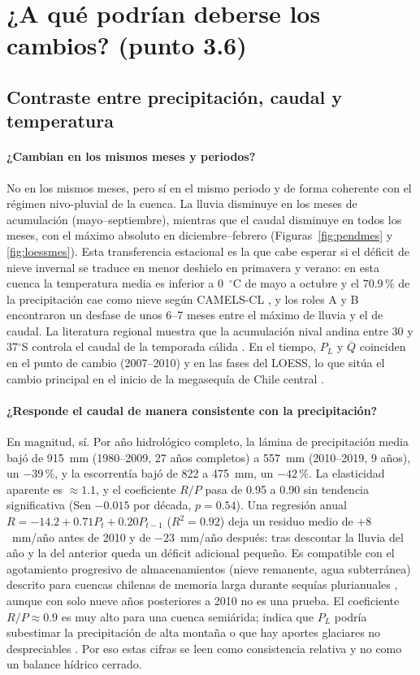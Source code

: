 \documentclass[11pt,letterpaper]{article}
\begin{document}
\section{¿A qué podrían deberse los cambios? (punto 3.6)}

\subsection{Contraste entre precipitación, caudal y temperatura}

\paragraph{¿Cambian en los mismos meses y periodos?} No en los mismos meses, pero sí en el mismo periodo y
de forma coherente con el régimen nivo-pluvial de la cuenca. La lluvia disminuye en los meses de acumulación
(mayo--septiembre), mientras que el caudal disminuye en todos los meses, con el máximo absoluto en
diciembre--febrero (Figuras~\ref{fig:pendmes} y \ref{fig:loessmes}). Esta transferencia estacional es la que
cabe esperar si el déficit de nieve invernal se traduce en menor deshielo en primavera y verano: en esta cuenca
la temperatura media es inferior a 0~$^\circ$C de mayo a octubre y el 70.9\,\% de la precipitación cae como nieve
según CAMELS-CL \citep{AlvarezGarreton2018}, y los roles A y B encontraron un desfase de unos 6--7 meses entre
el máximo de lluvia y el de caudal. La literatura regional muestra que la acumulación nival andina entre
30 y 37$^\circ$S controla el caudal de la temporada cálida \citep{Masiokas2006}. En el tiempo, $P_L$ y $\overline{Q}$
coinciden en el punto de cambio (2007--2010) y en las fases del LOESS, lo que sitúa el cambio principal en el
inicio de la megasequía de Chile central \citep{Garreaud2017,Garreaud2020}.

\paragraph{¿Responde el caudal de manera consistente con la precipitación?} En magnitud, sí. Por año
hidrológico completo, la lámina de precipitación media bajó de 915~mm (1980--2009, 27 años completos) a 557~mm
(2010--2019, 9 años), un $-39$\,\%, y la escorrentía bajó de 822 a 475~mm, un $-42$\,\%. La elasticidad aparente
es $\approx1.1$, y el coeficiente $R/P$ pasa de 0.95 a 0.90 sin tendencia significativa (Sen $-0.015$ por década,
$p=0.54$). Una regresión anual $R=-14.2+0.71P_t+0.20P_{t-1}$ ($R^2=0.92$) deja un residuo medio de
$+8$~mm/año antes de 2010 y de $-23$~mm/año después: tras descontar la lluvia del año y la del anterior queda
un déficit adicional pequeño. Es compatible con el agotamiento progresivo de almacenamientos (nieve
remanente, agua subterránea) descrito para cuencas chilenas de memoria larga durante sequías plurianuales
\citep{AlvarezGarreton2021}, aunque con solo nueve años posteriores a 2010 no es una prueba. El coeficiente
$R/P\approx0.9$ es muy alto para una cuenca semiárida; indica que $P_L$ podría subestimar la precipitación de
alta montaña o que hay aportes glaciares no despreciables \citep{Ayala2020}. Por eso estas cifras se leen como
consistencia relativa y no como un balance hídrico cerrado.
\end{document}
